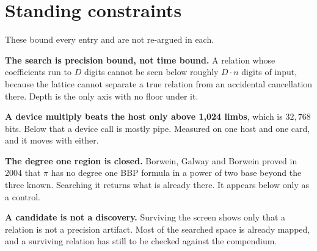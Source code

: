 \section{Standing constraints}

These bound every entry and are not re-argued in each.

\textbf{The search is precision bound, not time bound.} A relation whose coefficients run to \(D\) digits cannot be seen below roughly \(D \cdot n\) digits of input, because the lattice cannot separate a true relation from an accidental cancellation there. Depth is the only axis with no floor under it.

\textbf{A device multiply beats the host only above 1,024 limbs}, which is \(32{,}768\) bits. Below that a device call is mostly pipe. Measured on one host and one card, and it moves with either.

\textbf{The degree one region is closed.} Borwein, Galway and Borwein proved in 2004 that \(\pi\) has no degree one BBP formula in a power of two base beyond the three known. Searching it returns what is already there. It appears below only as a control.

\textbf{A candidate is not a discovery.} Surviving the screen shows only that a relation is not a precision artifact. Most of the searched space is already mapped, and a surviving relation has still to be checked against the compendium.
